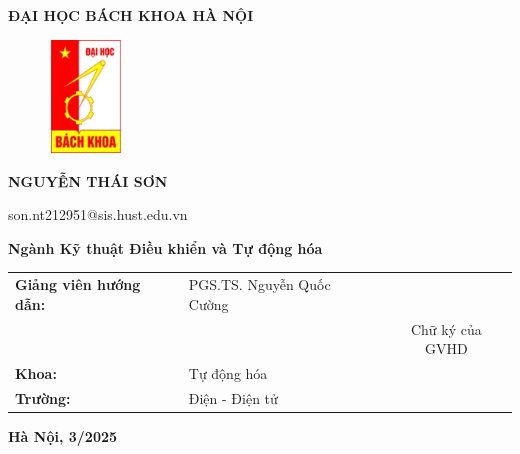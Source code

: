 
\begin{center}
    \vspace{12pt} %
        \textbf{\fontsize{15pt}{0pt} \selectfont{} ĐẠI HỌC BÁCH KHOA HÀ NỘI }
    \vspace{0.5cm}
    
\begin{figure}[H]
    \centering
    \includegraphics[width=2cm,height=3cm]{logoBK.png}
\end{figure}

\vspace{48pt}
\vspace{24pt}

\vspace{18pt}

        \fontsize{14pt}{0pt}\selectfont{} \textbf{NGUYỄN THÁI SƠN}
    \vspace{3pt}

        \fontsize{14pt}{0pt}\selectfont{} son.nt212951@sis.hust.edu.vn
    \vspace{12pt} %

        \fontsize{14pt}{0pt}\selectfont{} \textbf{Ngành Kỹ thuật Điều khiển và Tự động hóa}  
\end{center}
    \vspace{48pt}

\begin{table}[H]
    \centering
        \begin{tabular}{l l c}
            \textbf{Giảng viên hướng dẫn:}    &  PGS.TS. Nguyễn Quốc Cường \vspace{6pt} & \\
            &\vspace{3pt} & \fontsize{10pt}{0pt}\selectfont{} Chữ ký của GVHD \\
            \textbf{Khoa:} & Tự động hóa \vspace{3pt}\\ 
            \textbf{Trường:} & Điện - Điện tử
        \end{tabular}
\end{table}

\begin{center}
    \vspace{48pt}
    \fontsize{14pt}{0pt}\selectfont{} \textbf{Hà Nội, 3/2025}
\end{center}